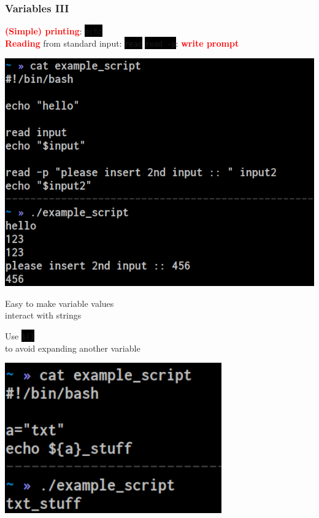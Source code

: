 \documentclass[unknownkeysallowed, 10pt, a4 paper, handout]{beamer}
\newcommand{\focus}[1]{\textbf{\textcolor{red}{#1}}}
\newcommand{\code}[1]{\colorbox{black}{\color{green}\texttt{#1}}}
\newcommand{\sidebyside}[5]{
  \begin{minipage}{#1\textwidth}
    #2
  \end{minipage} #3 \begin{minipage}{#4\textwidth}
    #5
  \end{minipage}
}
\begin{document}
\begin{frame}
  \begin{center}
    \frametitle{Variables III}

    \sidebyside{0.50}{
      \focus{(Simple) printing}: \code{echo}\\

      \focus{Reading} from standard input: \code{read}
      \code{read -p}: \focus{write prompt}
    }{\hfill}{0.45}{
      \begin{center}
        \includegraphics[width=1.00\textwidth]{pics/echoread.png}
      \end{center}
    }

    \vspace{6mm}

    \sidebyside{0.50}{
      \centering
      Easy to make variable values\\
      interact with strings

      \vspace{2mm}

      Use \code{\$\{<variable name>\}}\\
      to avoid expanding another variable
    }{\hfill}{0.45}{
      \begin{center}
        \includegraphics[width=0.70\textwidth]{pics/variables_2.png}
      \end{center}
    }
  \end{center}
\end{frame}
\end{document}
